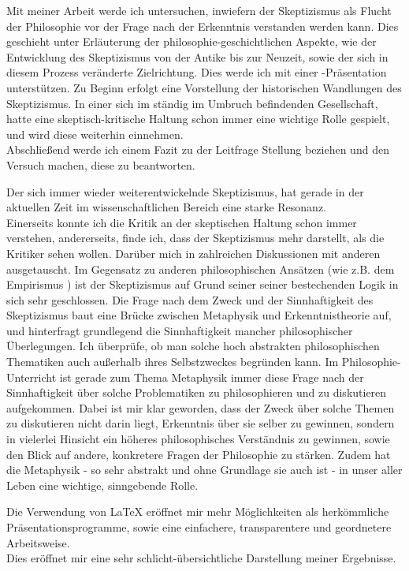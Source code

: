 \documentclass[12pt,a4paper,final]{article}
\begin{document}
Mit meiner Arbeit werde ich untersuchen, inwiefern der Skeptizismus als Flucht der Philosophie vor der Frage nach der Erkenntnis verstanden werden kann. Dies geschieht unter Erläuterung der philosophie-geschichtlichen Aspekte, wie der Entwicklung des Skeptizismus von der Antike bis zur Neuzeit, sowie der sich in diesem Prozess veränderte Zielrichtung. Dies werde ich mit einer %
 -Präsentation unterstützen. Zu Beginn erfolgt eine Vorstellung der historischen Wandlungen des Skeptizismus. In einer sich im ständig im Umbruch befindenden Gesellschaft, hatte eine skeptisch-kritische Haltung schon immer eine wichtige Rolle gespielt, und wird diese weiterhin einnehmen.\\
 Abschließend werde ich einem Fazit zu der Leitfrage Stellung beziehen und den Versuch machen, diese zu beantworten.
 
 Der sich immer wieder weiterentwickelnde Skeptizismus, hat gerade in der aktuellen Zeit im wissenschaftlichen Bereich eine starke Resonanz.\\ %
Einerseits konnte ich die Kritik an der skeptischen Haltung schon immer verstehen, andererseits, finde ich, dass der Skeptizismus mehr darstellt, als die Kritiker sehen wollen. %
Darüber mich in zahlreichen Diskussionen mit anderen ausgetauscht. Im Gegensatz zu anderen philosophischen Ansätzen (wie z.B. dem Empirismus %
) ist der Skeptizismus auf Grund seiner seiner bestechenden Logik in sich sehr geschlossen. Die Frage nach dem Zweck und der Sinnhaftigkeit des Skeptizismus baut eine Brücke zwischen Metaphysik und Erkenntnistheorie auf, und hinterfragt grundlegend die Sinnhaftigkeit mancher philosophischer Überlegungen.%
Ich überprüfe, ob man solche hoch abstrakten philosophischen Thematiken auch außerhalb ihres Selbstzweckes begründen kann.%
Im Philosophie-Unterricht ist gerade zum Thema Metaphysik immer diese Frage nach der Sinnhaftigkeit über solche Problematiken zu philosophieren und zu diskutieren aufgekommen.%
Dabei ist mir klar geworden, dass der Zweck über solche Themen zu diskutieren nicht darin liegt, Erkenntnis über sie selber zu gewinnen, sondern in vielerlei Hinsicht ein höheres philosophisches Verständnis zu gewinnen, sowie den Blick auf andere, konkretere Fragen der Philosophie zu stärken. Zudem hat die Metaphysik - so sehr abstrakt und ohne Grundlage sie auch ist - in unser aller Leben eine wichtige, sinngebende Rolle.

Die Verwendung von LaTeX eröffnet mir mehr Möglichkeiten als herkömmliche \\
Präsentationsprogramme, sowie eine einfachere, transparentere und geordnetere Arbeitsweise.\\
Dies eröffnet mir eine sehr schlicht-übersichtliche Darstellung meiner Ergebnisse.\\
\end{document}
